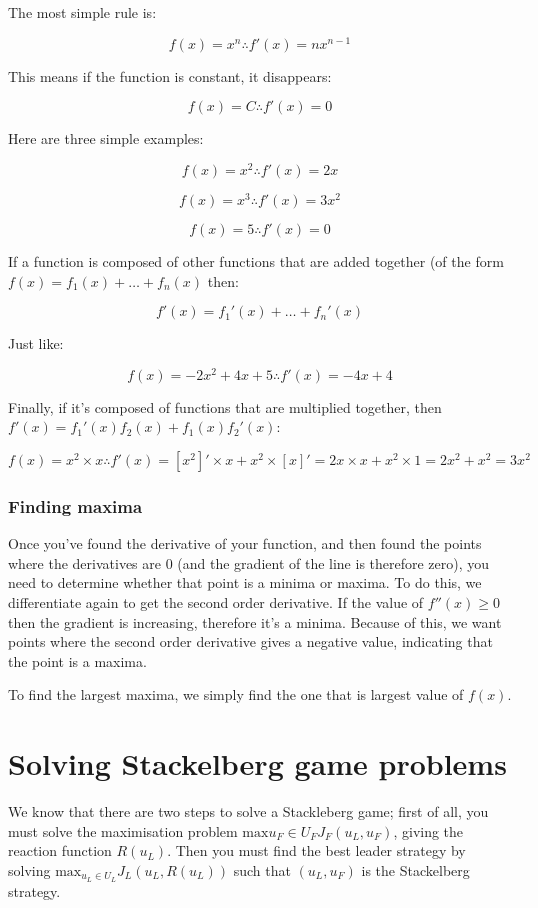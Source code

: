 The most simple rule is:

\[
  f(x) = x^n \therefore f'(x) = nx^{n-1}
\]

This means if the function is constant, it disappears:

\[
  f(x) = C \therefore f'(x) = 0
\]

Here are three simple examples:

\[
  f(x) = x^2 \therefore f'(x) = 2x
\]

\[
  f(x) = x^3 \therefore f'(x) = 3x^2
\]

\[
  f(x) = 5 \therefore f'(x) = 0
\]

If a function is composed of other functions that are added together (of the
form $f(x) = f_1(x) + \dots + f_n(x)$ then:

\[
  f'(x) = f_1'(x) + \dots + f_n'(x)
\]

Just like:

\[
  f(x) = -2x^2 + 4x + 5 \therefore f'(x) = -4x + 4
\]

Finally, if it's composed of functions that are multiplied together, then
$f'(x)= f_1'(x)f_2(x) + f_1(x)f_2'(x)$:

\[
  f(x) = x^2 \times x \therefore
    f'(x) = [x^2]' \times x + x^2 \times [x]' = 2x \times x + x^2 \times 1
          = 2x^2 + x^2 = 3x^2
\]

\subsubsection{Finding maxima}

Once you've found the derivative of your function, and then found the points
where the derivatives are 0 (and the gradient of the line is therefore zero),
you need to determine whether that point is a minima or maxima. To do this, we
differentiate again to get the second order derivative. If the value of $f''(x)
\geq 0$ then the gradient is increasing, therefore it's a minima. Because of
this, we want points where the second order derivative gives a negative value,
indicating that the point is a maxima.

To find the largest maxima, we simply find the one that is largest value of
$f(x)$.


\section{Solving Stackelberg game problems}

We know that there are two steps to solve a Stackleberg game; first of all, you
must solve the maximisation problem $\text{max}{u_F\in U_F}J_F(u_L,u_F)$, giving
the reaction function $R(u_L)$. Then you must find the best leader strategy by
solving $\text{max}_{u_L \in U_L} J_L(u_L, R(u_L))$ such that $(u_L, u_F)$ is
the Stackelberg strategy.

